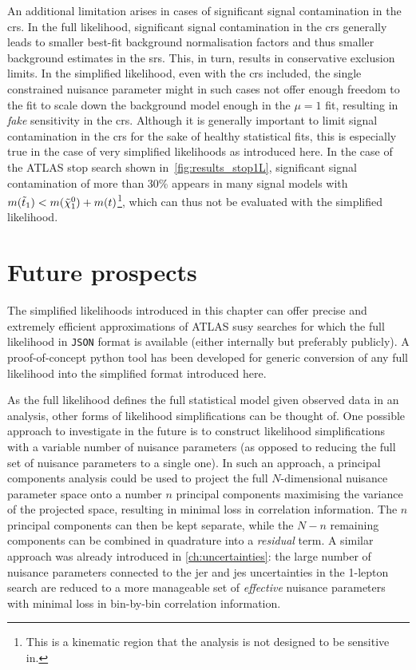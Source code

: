 An additional limitation arises in cases of significant signal contamination in the \glspl{cr}. In the full likelihood, significant signal contamination in the \glspl{cr} generally leads to smaller best-fit background normalisation factors and thus smaller background estimates in the \glspl{sr}. This, in turn, results in conservative exclusion limits. In the simplified likelihood, even with the \glspl{cr} included, the single constrained nuisance parameter might in such cases not offer enough freedom to the fit to scale down the background model enough in the $\mu = 1$ fit, resulting in \textit{fake} sensitivity in the \glspl{cr}. Although it is generally important to limit signal contamination in the \glspl{cr} for the sake of healthy statistical fits, this is especially true in the case of very simplified likelihoods as introduced here. In the case of the ATLAS stop search shown in~\cref{fig:results_stop1L}, significant signal contamination of more than 30\% appears in many signal models with $m(\tilde{t}_1) < m(\tilde{\chi}_1^0)+m(t)$\footnote{This is a kinematic region that the analysis is not designed to be sensitive in.}, which can thus not be evaluated with the simplified likelihood.

\section{Future prospects}

The simplified likelihoods introduced in this chapter can offer precise and extremely efficient approximations of ATLAS \gls{susy} searches for which the full likelihood in \texttt{JSON} format is available (either internally but preferably publicly). A proof-of-concept python tool has been developed for generic conversion of any full likelihood into the simplified format introduced here.

As the full likelihood defines the full statistical model given observed data in an analysis, other forms of likelihood simplifications can be thought of. One possible approach to investigate in the future is to construct likelihood simplifications with a variable number of nuisance parameters (as opposed to reducing the full set of nuisance parameters to a single one). In such an approach, a principal components analysis could be used to project the full $N$-dimensional nuisance parameter space onto a number $n$ principal components maximising the variance of the projected space, \ie resulting in minimal loss in correlation information. The $n$ principal components can then be kept separate, while the $N-n$ remaining components can be combined in quadrature into a \textit{residual} term. A similar approach was already introduced in \cref{ch:uncertainties}: the large number of nuisance parameters connected to the \gls{jer} and \gls{jes} uncertainties in the 1-lepton search are reduced to a more manageable set of \textit{effective} nuisance parameters with minimal loss in bin-by-bin correlation information. 

